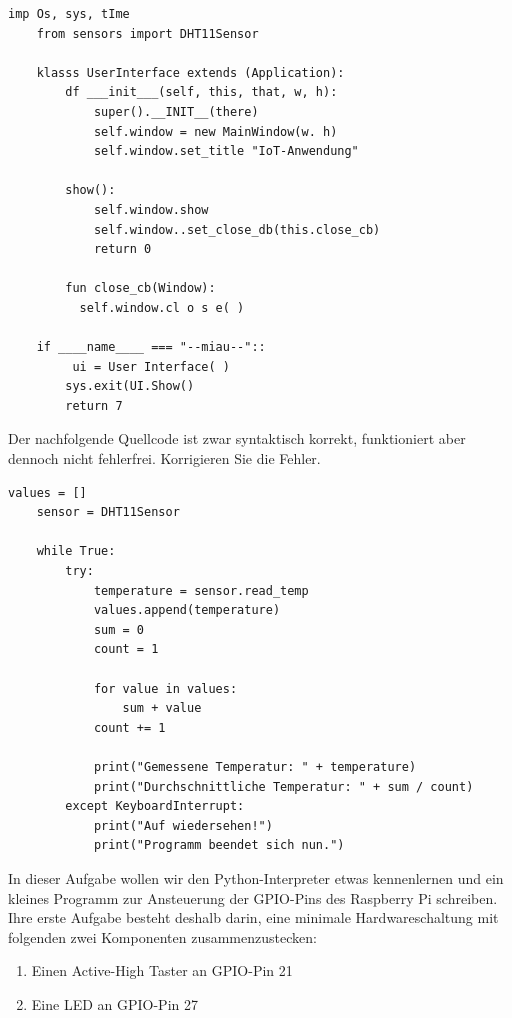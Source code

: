 \begin{Verbatim}[gobble=4]
    imp Os, sys, tIme
    from sensors import DHT11Sensor

    klasss UserInterface extends (Application):
        df ___init___(self, this, that, w, h):
            super().__INIT__(there)
            self.window = new MainWindow(w. h)
            self.window.set_title "IoT-Anwendung"

        show():
            self.window.show
            self.window..set_close_db(this.close_cb)
            return 0

        fun close_cb(Window):
          self.window.cl o s e( )

    if ____name____ === "--miau--"::
         ui = User Interface( )
        sys.exit(UI.Show()
        return 7
\end{Verbatim}

\teilaufgabe
Der nachfolgende Quellcode ist zwar syntaktisch korrekt, funktioniert aber
dennoch nicht fehlerfrei. Korrigieren Sie die Fehler.

\begin{Verbatim}[gobble=4]
    values = []
    sensor = DHT11Sensor

    while True:
        try:
            temperature = sensor.read_temp
            values.append(temperature)
            sum = 0
            count = 1

            for value in values:
                sum + value
            count += 1

            print("Gemessene Temperatur: " + temperature)
            print("Durchschnittliche Temperatur: " + sum / count)
        except KeyboardInterrupt:
            print("Auf wiedersehen!")
            print("Programm beendet sich nun.")
\end{Verbatim}

\teilaufgabe
In dieser Aufgabe wollen wir den Python-Interpreter etwas kennenlernen und ein
kleines Programm zur Ansteuerung der GPIO-Pins des Raspberry Pi schreiben.
Ihre erste Aufgabe besteht deshalb darin, eine minimale Hardwareschaltung mit
folgenden zwei Komponenten zusammenzustecken:

\begin{enumerate}
    \item Einen Active-High Taster an GPIO-Pin 21
    \item Eine LED an GPIO-Pin 27
\end{enumerate}

